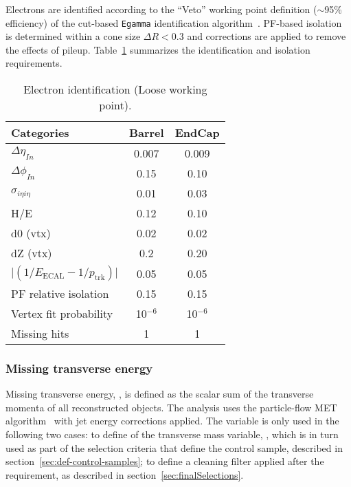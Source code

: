 Electrons are identified according to the ``Veto'' working point
definition ($\sim$95\% efficiency) of the cut-based \verb!Egamma!
identification algorithm~\cite{ref:electron-id}. PF-based
isolation~\cite{ref:electron-isolation} is determined within a cone
size $\Delta R < 0.3$ and corrections are applied to remove the effects 
of pileup. Table~\ref{tab:ele-id} summarizes the identification 
and isolation requirements. 

\begin{table}[h!]
  \caption{Electron identification (Loose working point).\label{tab:ele-id}}
  \centering
  \footnotesize
  \begin{tabular}{ lcc }
    \hline
    \hline
    Categories                                               & Barrel    & EndCap    \\
    \hline
    $\Delta \eta_{In}$                                       & 0.007     & 0.009     \\
    $\Delta \phi_{In}$                                       & 0.15      & 0.10      \\
    $\sigma_{i\eta i\eta}$                                   & 0.01      & 0.03      \\
    H/E                                                      & 0.12      & 0.10      \\
    d0 (vtx)                                                 & 0.02      & 0.02      \\
    dZ (vtx)                                                 & 0.2       & 0.20      \\
    $\lvert(1/E_{\textrm{ECAL}} - 1/p_{\textrm{trk}})\rvert$ & 0.05      & 0.05      \\
    PF relative isolation                                    & 0.15      & 0.15      \\
    Vertex fit probability                                   & 10$^{-6}$ & 10$^{-6}$ \\
    Missing hits                                             & 1         & 1         \\
    \hline
    \hline
  \end{tabular}
\end{table}


\subsubsection{Missing transverse energy\label{sec:recMET}}

Missing transverse energy, \met, is defined as the scalar sum of the transverse momenta 
of all reconstructed objects. The analysis uses the particle-flow MET 
algorithm~\cite{ref:MET-corrections} with jet energy corrections applied. 
The \met variable is only used in the following two cases: to define of the transverse mass 
variable, \mt, which is in turn used as part of the selection criteria that define the 
\mj control sample, described in section~\ref{sec:def-control-samples}; to define a 
cleaning filter applied after the \alphat requirement, as described in 
section~\ref{sec:finalSelections}.


